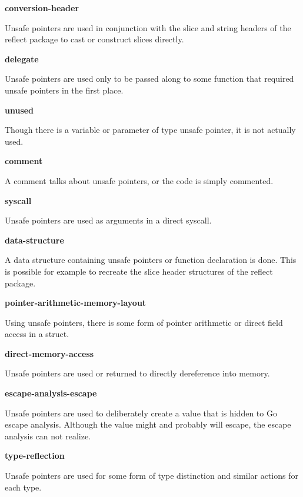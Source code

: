 


\textbf{conversion-header}

Unsafe pointers are used in conjunction with the slice and string headers of the reflect package to cast or construct
slices directly.




\textbf{delegate}

Unsafe pointers are used only to be passed along to some function that required unsafe pointers in the first place.




\textbf{unused}

Though there is a variable or parameter of type unsafe pointer, it is not actually used.




\textbf{comment}

A comment talks about unsafe pointers, or the code is simply commented.




\textbf{syscall}

Unsafe pointers are used as arguments in a direct syscall.




\textbf{data-structure}

A data structure containing unsafe pointers or function declaration is done.
This is possible for example to recreate the slice header structures of the reflect package.




\textbf{pointer-arithmetic-memory-layout}

Using unsafe pointers, there is some form of pointer arithmetic or direct field access in a struct.




\textbf{direct-memory-access}

Unsafe pointers are used or returned to directly dereference into memory.




\textbf{escape-analysis-escape}

Unsafe pointers are used to deliberately create a value that is hidden to Go escape analysis.
Although the value might and probably will escape, the escape analysis can not realize.




\textbf{type-reflection}

Unsafe pointers are used for some form of type distinction and similar actions for each type.

